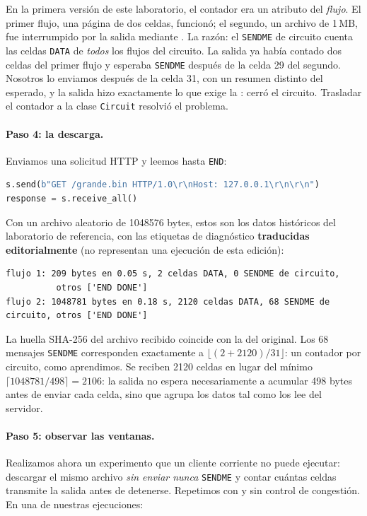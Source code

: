 \begin{attenzione}
En la primera versión de este laboratorio, el contador era un atributo del \emph{flujo}. El primer flujo, una página de dos celdas, funcionó; el segundo, un archivo de 1\,MB, fue interrumpido por la salida mediante . La razón: el \texttt{SENDME} de circuito cuenta las celdas \texttt{DATA} de \emph{todos} los flujos del circuito. La salida ya había contado dos celdas del primer flujo y esperaba \texttt{SENDME} después de la celda 29 del segundo. Nosotros lo enviamos después de la celda 31, con un resumen distinto del esperado, y la salida hizo exactamente lo que exige la : cerró el circuito. Trasladar el contador a la clase \texttt{Circuit} resolvió el problema.
\end{attenzione}

\paragraph{Paso 4: la descarga.} Enviamos una solicitud HTTP y leemos hasta \texttt{END}:

\begin{lstlisting}[language=Python]
s.send(b"GET /grande.bin HTTP/1.0\r\nHost: 127.0.0.1\r\n\r\n")
response = s.receive_all()
\end{lstlisting}

Con un archivo aleatorio de \num{1048576} bytes, estos son los datos históricos del laboratorio de referencia, con las etiquetas de diagnóstico \textbf{traducidas editorialmente} (no representan una ejecución de esta edición):

\begin{lstlisting}[numbers=none]
flujo 1: 209 bytes en 0.05 s, 2 celdas DATA, 0 SENDME de circuito,
          otros ['END DONE']
flujo 2: 1048781 bytes en 0.18 s, 2120 celdas DATA, 68 SENDME de circuito, otros ['END DONE']
\end{lstlisting}

La huella SHA-256 del archivo recibido coincide con la del original. Los 68 mensajes \texttt{SENDME} corresponden exactamente a $\lfloor (2 + 2120) / 31 \rfloor$: un contador por circuito, como aprendimos. Se reciben 2120 celdas en lugar del mínimo $\lceil 1048781 / 498 \rceil = 2106$: la salida no espera necesariamente a acumular 498 bytes antes de enviar cada celda, sino que agrupa los datos tal como los lee del servidor.

\paragraph{Paso 5: observar las ventanas.} Realizamos ahora un experimento que un cliente corriente no puede ejecutar: descargar el mismo archivo \emph{sin enviar nunca} \texttt{SENDME} y contar cuántas celdas transmite la salida antes de detenerse. Repetimos con y sin control de congestión. En una de nuestras ejecuciones:

